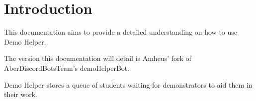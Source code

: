 
\section{Introduction}
This documentation aims to provide a detailed understanding on how to use Demo Helper.

The version this documentation will detail is Amheus' fork of AberDiscordBotsTeam's demoHelperBot.


Demo Helper stores a queue of students waiting for demonstrators to aid them in their work.
